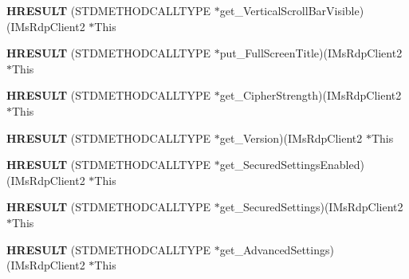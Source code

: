 \begin{DoxyCompactItemize}
\mbox{\label{struct_i_ms_rdp_client2_vtbl_a881f741f6ed392fbf42d3d8e248e8169}} 
{\bfseries H\+R\+E\+S\+U\+LT} (S\+T\+D\+M\+E\+T\+H\+O\+D\+C\+A\+L\+L\+T\+Y\+PE $\ast$get\+\_\+\+Vertical\+Scroll\+Bar\+Visible)(I\+Ms\+Rdp\+Client2 $\ast$This
\item 
\mbox{\label{struct_i_ms_rdp_client2_vtbl_a4743b0616b856ad329012228ca95b53f}} 
{\bfseries H\+R\+E\+S\+U\+LT} (S\+T\+D\+M\+E\+T\+H\+O\+D\+C\+A\+L\+L\+T\+Y\+PE $\ast$put\+\_\+\+Full\+Screen\+Title)(I\+Ms\+Rdp\+Client2 $\ast$This
\item 
\mbox{\label{struct_i_ms_rdp_client2_vtbl_aff299b65596aeadbd1a25e961a7cdc47}} 
{\bfseries H\+R\+E\+S\+U\+LT} (S\+T\+D\+M\+E\+T\+H\+O\+D\+C\+A\+L\+L\+T\+Y\+PE $\ast$get\+\_\+\+Cipher\+Strength)(I\+Ms\+Rdp\+Client2 $\ast$This
\item 
\mbox{\label{struct_i_ms_rdp_client2_vtbl_a4ebfc89066bbb21544760ecf44173cd8}} 
{\bfseries H\+R\+E\+S\+U\+LT} (S\+T\+D\+M\+E\+T\+H\+O\+D\+C\+A\+L\+L\+T\+Y\+PE $\ast$get\+\_\+\+Version)(I\+Ms\+Rdp\+Client2 $\ast$This
\item 
\mbox{\label{struct_i_ms_rdp_client2_vtbl_a19aa123dbbf388880cd91ac6879328e9}} 
{\bfseries H\+R\+E\+S\+U\+LT} (S\+T\+D\+M\+E\+T\+H\+O\+D\+C\+A\+L\+L\+T\+Y\+PE $\ast$get\+\_\+\+Secured\+Settings\+Enabled)(I\+Ms\+Rdp\+Client2 $\ast$This
\item 
\mbox{\label{struct_i_ms_rdp_client2_vtbl_a41bf978a9aed5f2df0021b37598b70bc}} 
{\bfseries H\+R\+E\+S\+U\+LT} (S\+T\+D\+M\+E\+T\+H\+O\+D\+C\+A\+L\+L\+T\+Y\+PE $\ast$get\+\_\+\+Secured\+Settings)(I\+Ms\+Rdp\+Client2 $\ast$This
\item 
\mbox{\label{struct_i_ms_rdp_client2_vtbl_ab83c9467e5ddc24ff7ff669640e9b66c}} 
{\bfseries H\+R\+E\+S\+U\+LT} (S\+T\+D\+M\+E\+T\+H\+O\+D\+C\+A\+L\+L\+T\+Y\+PE $\ast$get\+\_\+\+Advanced\+Settings)(I\+Ms\+Rdp\+Client2 $\ast$This
\item 
\mbox{\label{struct_i_ms_rdp_client2_vtbl_a6d5951208ce95feaceca593d7148aa07}} 

\end{DoxyCompactItemize}
